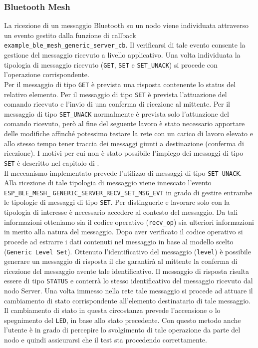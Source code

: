 \subsubsection{Bluetooth Mesh}
La ricezione di un messaggio Bluetooth su un nodo viene individuata attraverso un evento gestito dalla funzione di callback \texttt{example\_ble\_mesh\_generic\_server\_cb}. Il verificarsi di tale evento consente la gestione del messaggio ricevuto a livello applicativo. Una volta individuata la tipologia di messaggio ricevuto (\texttt{GET}, \texttt{SET} e \texttt{SET\_UNACK}) si procede con l'operazione corrispondente.\\
Per il messaggio di tipo \texttt{GET} è prevista una risposta contenente lo status del relativo elemento.
Per il messaggio di tipo \texttt{SET} è prevista l'attuazione del comando ricevuto e l'invio di una conferma di ricezione al mittente.
Per il messaggio di tipo \texttt{SET\_UNACK} normalmente è prevista solo l'attuazione del comando ricevuto, però al fine del seguente lavoro è stato necessario apportare delle modifiche affinché potessimo testare la rete con un carico di lavoro elevato e allo stesso tempo tener traccia dei messaggi giunti a destinazione (conferma di ricezione). I motivi per cui non è stato possibile l'impiego dei messaggi di tipo \texttt{SET} è descritto nel capitolo di .\\

\noindent Il meccanismo implementato prevede l'utilizzo di messaggi di tipo \texttt{SET\_UNACK}. Alla ricezione di tale tipologia di messaggio viene innescato l'evento \texttt{ESP\_BLE\_MESH\_} \texttt{GENERIC\_SERVER\_RECV\_SET\_MSG\_EVT} in grado di gestire entrambe le tipologie di messaggi di tipo \texttt{SET}. Per distinguerle e lavorare solo con la tipologia di interesse è necessario accedere al contesto del messaggio. Da tali informazioni otteniamo sia il codice operativo (\texttt{recv\_op}) sia ulteriori informazioni in merito alla natura del messaggio. Dopo aver verificato il codice operativo si procede ad estrarre i dati contenuti nel messaggio in base al modello scelto (\texttt{Generic Level Set}). Ottenuto l'identificativo del messaggio (\texttt{level}) è possibile generare un messaggio di risposta il che garantirà al mittente la conferma di ricezione del messaggio avente tale identificativo. Il messaggio di risposta risulta essere di tipo \texttt{STATUS} e conterrà lo stesso identificativo del messaggio ricevuto dal nodo Server. Una volta immesso nella rete tale messaggio si procede ad attuare il cambiamento di stato corrispondente all'elemento destinatario di tale messaggio. Il cambiamento di stato in questa circostanza prevede l'accensione o lo spegnimento del \texttt{LED}, in base allo stato precedente. Con questo metodo anche l'utente è in grado di percepire lo svolgimento di tale operazione da parte del nodo e quindi assicurarsi che il test sta procedendo correttamente.

